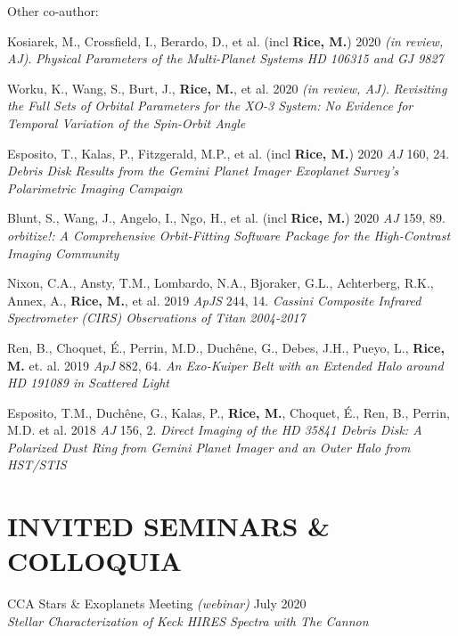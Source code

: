 \documentclass[margin]{res}
\begin{document}
\begin{resume}
Other co-author:
\begin{etaremune}
\item Kosiarek, M., Crossfield, I., Berardo, D., et al. (incl \textbf{Rice, M.}) 2020 \textit{(in review, AJ)}. \textit{Physical Parameters of the Multi-Planet Systems HD 106315 and GJ 9827}
\item  Worku, K., Wang, S., Burt, J., \textbf{Rice, M.}, et al. 2020 \textit{(in review, \textit{AJ})}.  \textit{Revisiting the Full Sets of Orbital Parameters for the XO-3 System: No Evidence for Temporal Variation of the Spin-Orbit Angle}
\item Esposito, T., Kalas, P., Fitzgerald, M.P., et al. (incl \textbf{Rice, M.}) 2020 \textit{AJ} 160, 24. \textit{Debris Disk Results from the Gemini Planet Imager Exoplanet Survey's Polarimetric Imaging Campaign}
\item Blunt, S., Wang, J.,  Angelo, I.,  Ngo, H., et al. (incl \textbf{Rice, M.}) 2020 \textit{AJ} 159, 89. \textit{orbitize!: A Comprehensive Orbit-Fitting Software Package for the High-Contrast Imaging Community}
\item Nixon, C.A., Ansty, T.M., Lombardo, N.A., Bjoraker, G.L., Achterberg, R.K., Annex, A., \textbf{Rice, M.}, et al. 2019 \textit{ApJS} 244, 14. \textit{Cassini Composite Infrared Spectrometer (CIRS) Observations of Titan 2004-2017}
\item Ren, B., Choquet, \'{E.}, Perrin, M.D., Duch\^{e}ne, G., Debes, J.H., Pueyo, L., \textbf{Rice, M.} et. al. 2019 \textit{ApJ} 882, 64. \textit{An Exo-Kuiper Belt with an Extended Halo around HD 191089 in Scattered Light}
\item Esposito, T.M., Duch\^{e}ne, G., Kalas, P., \textbf{Rice, M.}, Choquet, \'{E}., Ren, B., Perrin, M.D. et al. 2018 \textit{AJ} 156, 2. \textit{Direct Imaging of the HD 35841 Debris Disk: A Polarized Dust Ring from Gemini Planet Imager and an Outer Halo from HST/STIS}
\end{etaremune}



\section{\normalfont INVITED SEMINARS \& COLLOQUIA}
CCA Stars \& Exoplanets Meeting \textit{(webinar)} \hfill July 2020 \\
\textit{Stellar Characterization of Keck HIRES Spectra with The Cannon}


\end{resume}
\end{document}
